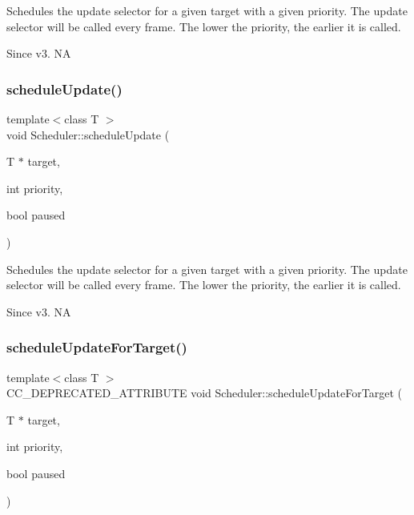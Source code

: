 Schedules the \textquotesingle{}update\textquotesingle{} selector for a given target with a given priority. The \textquotesingle{}update\textquotesingle{} selector will be called every frame. The lower the priority, the earlier it is called. \begin{DoxySince}{Since}
v3.  NA 
\end{DoxySince}
\mbox{\label{classScheduler_ad566d55a4941459c185e6faeddc3a70f}} 
\subsubsection{\texorpdfstring{schedule\+Update()}{scheduleUpdate()}\hspace{0.1cm}{\footnotesize\ttfamily [2/2]}}
{\footnotesize\ttfamily template$<$class T $>$ \\
void Scheduler\+::schedule\+Update (\begin{DoxyParamCaption}\item[{T $\ast$}]{target,  }\item[{int}]{priority,  }\item[{bool}]{paused }\end{DoxyParamCaption})\hspace{0.3cm}{\ttfamily [inline]}}

Schedules the \textquotesingle{}update\textquotesingle{} selector for a given target with a given priority. The \textquotesingle{}update\textquotesingle{} selector will be called every frame. The lower the priority, the earlier it is called. \begin{DoxySince}{Since}
v3.  NA 
\end{DoxySince}
\mbox{\label{classScheduler_a87a354dc2bcf3a750ed66f8d67ed0b70}} 
\subsubsection{\texorpdfstring{schedule\+Update\+For\+Target()}{scheduleUpdateForTarget()}\hspace{0.1cm}{\footnotesize\ttfamily [1/2]}}
{\footnotesize\ttfamily template$<$class T $>$ \\
C\+C\+\_\+\+D\+E\+P\+R\+E\+C\+A\+T\+E\+D\+\_\+\+A\+T\+T\+R\+I\+B\+U\+TE void Scheduler\+::schedule\+Update\+For\+Target (\begin{DoxyParamCaption}\item[{T $\ast$}]{target,  }\item[{int}]{priority,  }\item[{bool}]{paused }\end{DoxyParamCaption})\hspace{0.3cm}{\ttfamily [inline]}}

